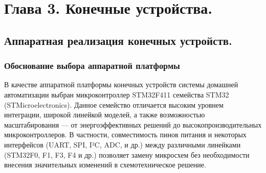 \documentclass[a4paper,12pt]{article}
\begin{document}
\newpage

\section{Глава 3. Конечные устройства.}

\subsection{Аппаратная реализация конечных устройств.}

\subsubsection{Обоснование выбора аппаратной платформы}

В качестве аппаратной платформы конечных устройств системы домашней автоматизации выбран микроконтроллер STM32F411 семейства STM32 (STMicroelectronics). Данное семейство отличается
высоким уровнем интеграции, широкой линейкой моделей, а также возможностью масштабирования — от энергоэффективных решений до высокопроизводительных микроконтроллеров. В частности,
совместимость пинов питания и некоторых интерфейсов (UART, SPI, I²C, ADC, и др.) между различными линейками (STM32F0, F1, F3, F4 и др.) позволяет замену микросхем без необходимости
внесения значительных изменений в схемотехническое решение.
\end{document}
